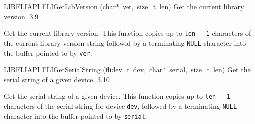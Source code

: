 \documentclass{article}
\begin{document}
\begin{cxxentry}
\begin{cxxfunction}
\begin{cxxdoc}
\end{cxxdoc}
\end{cxxfunction}
\begin{cxxfunction}
{LIBFLIAPI}
        {FLIGetLibVersion}
        {(char*\ ver,\ size\_t\ len)}
        { Get the current library version.}
        {3.9}
\begin{cxxdoc}

Get the current library version.  This function copies up to
\texttt{len - 1} characters of the current library version string
followed by a terminating \texttt{NULL} character into the buffer
pointed to by \texttt{ver}.


\end{cxxdoc}
\end{cxxfunction}
\begin{cxxfunction}
{LIBFLIAPI}
        {FLIGetSerialString}
        {(flidev\_t\ dev,\ char*\ serial,\ size\_t\ len)}
        { Get the serial string of a given device.}
        {3.10}
\begin{cxxdoc}

Get the serial string of a given device.  This function copies up to
\texttt{len - 1} characters of the serial string for device
\texttt{dev}, followed by a terminating \texttt{NULL} character
into the buffer pointed to by \texttt{serial}.



\end{cxxdoc}
\end{cxxfunction}
\end{cxxentry}
\end{document}
